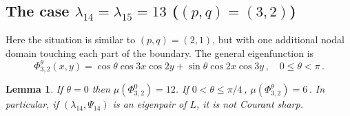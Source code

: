 \documentclass[a4paper,reqno,11pt]{amsart}
\newtheorem{lemma}[thm]{Lemma}
\theoremstyle{remark}
\theoremstyle{definition}
\numberwithin{equation}{section}
\begin{document}
\subsection{The case $\lambda_{14}=\lambda_{15}=13$ ($(p,q)=(3,2)$)}
Here the situation is similar to $(p,q)=(2,1)$, but with one additional
nodal domain touching each part of the boundary. The general eigenfunction
is
\begin{equation}
\label{eq:psi32}
\Phi_{3,2}^\theta (x,y)=\cos\theta\cos3x\cos 2y
+ \sin\theta\cos 2x\cos 3y\,,\quad 0\leq \theta<\pi\,.
\end{equation}

\begin{lemma}
\label{lem:3-2}
If $\theta=0$ then $\mu(\Phi_{3,2}^0)=12$. If $0<\theta\leq\pi/4\,$, 
$\mu(\Phi_{3,2}^{\theta})=6\,$. In particular, if $(\lambda_{14},\Psi_{14})$ is an
eigenpair of $L$, it is not Courant sharp.
\end{lemma}
\end{document}
